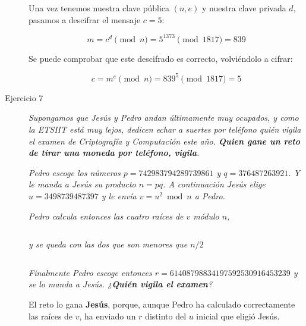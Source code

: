 \documentclass[10pt,spanish]{article}
\begin{document}
\begin{description}
    Una vez tenemos nuestra clave pública $(n,e)$ y nuestra clave privada $d$, pasamos a descifrar el mensaje $c = 5$:

    \begin{displaymath}
        m = c^d \pmod n = 5^{1373} \pmod{1817} = 839
    \end{displaymath}

    Se puede comprobar que este descifrado es correcto, volviéndolo a cifrar:

    \begin{displaymath}
        c = m^e \pmod n = 839^5 \pmod{1817} = 5
    \end{displaymath}

    \item[Ejercicio 7] \textit{Supongamos que Jesús y Pedro andan últimamente muy ocupados, y como la ETSIIT está muy lejos, dedicen echar a suertes por teléfono quién vigila el examen de Criptografía y Computación este año. \textbf{\textcolor{morado}{Quien gane un reto de tirar una moneda por teléfono, vigila}}.}

    \textit{Pedro escoge los números $p = 742983794289739861$ y $q = 376487263921$. Y le manda a Jesús su producto $n = pq$. A continuación Jesús elige $u = 3498739487397$ y le envía $v = u^2 \bmod n$ a Pedro.}

    \textit{Pedro calcula entonces las cuatro raíces de $v$ módulo $n$,}

    \begin{displaymath}
        [3498739487397, 61408798834197592530916453239, 
    \end{displaymath}
    \begin{displaymath}   
        218315137015589671259824401742, 279723935849787260292001367584]
    \end{displaymath}

    \textit{y se queda con las dos que son menores que $n/2$}

    \begin{displaymath}
        [3498739487397, 61408798834197592530916453239]
    \end{displaymath}

    \textit{Finalmente Pedro escoge entonces $r = 61408798834197592530916453239$ y se lo manda a Jesús. ¿\textcolor{morado}{\textbf{Quién vigila el examen}}?}

    El reto lo gana \textcolor{morado}{\textbf{Jesús}}, porque, aunque Pedro ha calculado correctamente las raíces de $v$, ha enviado un $r$ distinto del $u$ inicial que eligió Jesús.
\end{description}
\end{document}
